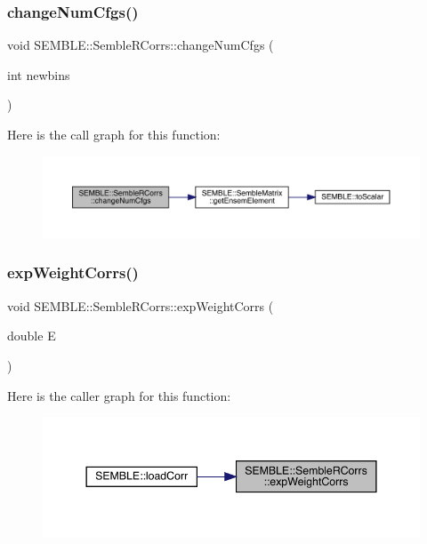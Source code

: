 \subsubsection{\texorpdfstring{changeNumCfgs()}{changeNumCfgs()}}
{\footnotesize\ttfamily void S\+E\+M\+B\+L\+E\+::\+Semble\+R\+Corrs\+::change\+Num\+Cfgs (\begin{DoxyParamCaption}\item[{int}]{newbins }\end{DoxyParamCaption})}

Here is the call graph for this function\+:
\nopagebreak
\begin{figure}[H]
\begin{center}
\leavevmode
\includegraphics[width=350pt]{d4/d78/classSEMBLE_1_1SembleRCorrs_aced86d0b621c0bd4f0a6a3535ac2b867_cgraph}
\end{center}
\end{figure}
\mbox{\label{classSEMBLE_1_1SembleRCorrs_a43b4d94666799da7276b526e47adcb9d}} 
\subsubsection{\texorpdfstring{expWeightCorrs()}{expWeightCorrs()}}
{\footnotesize\ttfamily void S\+E\+M\+B\+L\+E\+::\+Semble\+R\+Corrs\+::exp\+Weight\+Corrs (\begin{DoxyParamCaption}\item[{double}]{E }\end{DoxyParamCaption})}

Here is the caller graph for this function\+:
\nopagebreak
\begin{figure}[H]
\begin{center}
\leavevmode
\includegraphics[width=344pt]{d4/d78/classSEMBLE_1_1SembleRCorrs_a43b4d94666799da7276b526e47adcb9d_icgraph}
\end{center}
\end{figure}
\mbox{\label{classSEMBLE_1_1SembleRCorrs_ae1f2b28770210f22534588eb83b3c36e}} 
